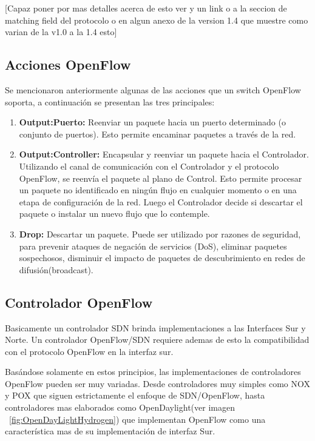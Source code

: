 [Capaz poner por mas detalles acerca de esto ver y un link o a la seccion de matching field del protocolo o en algun anexo de la version 1.4 que muestre como varian de la v1.0 a la 1.4 esto]

\subsection{Acciones OpenFlow}
Se mencionaron anteriormente algunas de las acciones que un switch OpenFlow soporta, a continuación se presentan las tres principales:

\begin{enumerate}
\item \textbf{Output:Puerto:} Reenviar un paquete hacia un puerto determinado (o conjunto de puertos). Esto permite encaminar paquetes a través de la red.
\item \textbf{Output:Controller:} Encapsular y reenviar un paquete hacia el Controlador. Utilizando el canal de comunicación con el Controlador y el protocolo OpenFlow, se reenvía el paquete al plano de Control. Esto permite procesar un paquete no identificado en ningún flujo en cualquier momento o en una etapa de configuración de la red. Luego el Controlador decide si descartar el paquete o instalar un nuevo flujo que lo contemple.
\item \textbf{Drop:} Descartar un paquete. Puede ser utilizado por razones de seguridad, para prevenir ataques de negación de servicios (DoS), eliminar paquetes sospechosos, disminuir el impacto de paquetes de descubrimiento en redes de difusión(broadcast).
\end{enumerate}

\subsection{Controlador OpenFlow}
Basicamente un controlador SDN brinda implementaciones a las Interfaces Sur y Norte. Un controlador OpenFlow/SDN requiere ademas de esto la compatibilidad con el protocolo OpenFlow en la interfaz sur. 

Basándose solamente en estos principios, las implementaciones de controladores OpenFlow pueden ser muy variadas. Desde controladores muy simples como NOX y POX que siguen estrictamente el enfoque de SDN/OpenFlow, hasta controladores mas elaborados como OpenDaylight(ver imagen ~\ref{fig:OpenDayLightHydrogen}) que implementan OpenFlow como una característica mas de su implementaci\'on de interfaz Sur.

